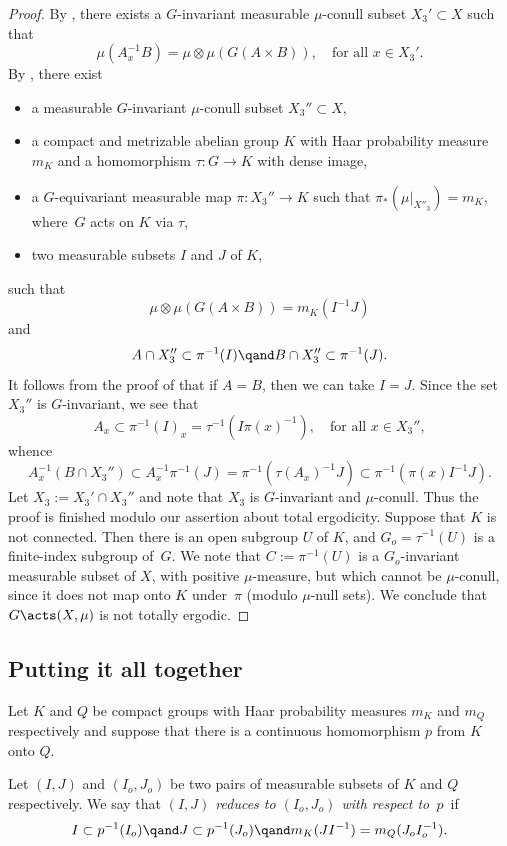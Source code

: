 \begin{proof}
By \cite[Lem.\,5.3]{BF}, there exists a $G$-invariant measurable $\mu$-conull subset \hbox{$X_3' \subset X$} such that
\[
\mu(A_x^{-1}B) = \mu \otimes \mu(G(A \times B)), \quad \textrm{for all $x \in X_3'$}.
\]
By \cite[Th.\,5.1]{BF}, there exist
\begin{itemize}
\item a measurable $G$-invariant $\mu$-conull subset $X_3'' \subset X$,
\item a compact and metrizable abelian group $K$ with Haar probability measure $m_K$ and
a homomorphism $\tau : G \to K$ with dense image,
\item a $G$-equivariant measurable map $\pi : X_3''\!\to\!K$ such that $\pi_*(\mu |_{X''_3})\!=\!m_K$, where~$G$ acts on $K$ via $\tau$,
\item two measurable subsets $I$ and $J$ of $K$,
\end{itemize}
such that
\[
\mu \otimes \mu (G(A \times B)) = m_K(I^{-1}J)
\]
and
\[
A \cap X_3'' \subset \pi^{-1}(I) \qand B \cap X_3'' \subset \pi^{-1}(J).
\]
It follows from the proof of \cite[Th.\,5.1]{BF} that if $A = B$, then we can take $I = J$. Since the set $X_3''$ is $G$-invariant,
we see that
\[
A_x \subset \pi^{-1}(I)_x = \tau^{-1}(I\pi(x)^{-1}), \quad \textrm{for all $x \in X_3''$},
\]
whence
\[
A_x^{-1}(B \cap X_3'') \subset A_x^{-1}\pi^{-1}(J) = \pi^{-1}(\tau(A_x)^{-1}J) \subset \pi^{-1}(\pi(x) I^{-1}J).
\]
Let $X_3 := X_3' \cap X_3''$ and note that $X_3$ is $G$-invariant and $\mu$-conull. Thus the proof is finished modulo our assertion about total ergodicity. Suppose that $K$ is not connected. Then there is an open subgroup $U$ of $K$, and $G_o = \tau^{-1}(U)$ is a finite-index
subgroup of~$G$. We note that $C := \pi^{-1}(U)$ is a $G_o$-invariant measurable subset of $X$, with positive $\mu$-measure, but
which cannot be $\mu$-conull, since it does not map onto $K$ under~$\pi$ (modulo $\mu$-null sets). We conclude that $G \acts (X,\mu)$
is not totally ergodic.
\end{proof}

\subsection{Putting it all together}

Let $K$ and $Q$ be compact groups with Haar probability measures $m_K$ and $m_Q$ respectively and
suppose that there is a continuous homomorphism $p$ from $K$ onto $Q$.

\begin{definition}
\label{def_reduction}
Let $(I,J)$ and $(I_o,J_o)$ be two pairs of measurable subsets of $K$ and $Q$ respectively. We say
that \emph{$(I,J)$ reduces to $(I_o,J_o)$ with respect to~$p$}~if
\[
I \subset p^{-1}(I_o) \qand J \subset p^{-1}(J_o) \qand m_K(J I^{-1}) = m_Q(J_o I_o^{-1}).
\]
\end{definition}

